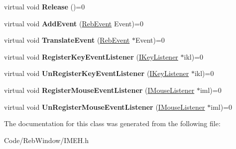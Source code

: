 \begin{DoxyCompactItemize}
\item 
virtual void {\bfseries Release} ()=0\hypertarget{class_i_m_e_h_ac47c3471945c993f1b4dfb35d8dd4a23}{}\label{class_i_m_e_h_ac47c3471945c993f1b4dfb35d8dd4a23}

\item 
virtual void {\bfseries Add\+Event} (\hyperlink{union_reb_event}{Reb\+Event} Event)=0\hypertarget{class_i_m_e_h_aa12fb49a27156061fe02c56b928963e5}{}\label{class_i_m_e_h_aa12fb49a27156061fe02c56b928963e5}

\item 
virtual void {\bfseries Translate\+Event} (\hyperlink{union_reb_event}{Reb\+Event} $\ast$Event)=0\hypertarget{class_i_m_e_h_aeb04da4f2405b896c93d299d0e17aa4c}{}\label{class_i_m_e_h_aeb04da4f2405b896c93d299d0e17aa4c}

\item 
virtual void {\bfseries Register\+Key\+Event\+Listener} (\hyperlink{class_i_key_listener}{I\+Key\+Listener} $\ast$ikl)=0\hypertarget{class_i_m_e_h_ae5c0421dd64b696ef51227254d18efe6}{}\label{class_i_m_e_h_ae5c0421dd64b696ef51227254d18efe6}

\item 
virtual void {\bfseries Un\+Register\+Key\+Event\+Listener} (\hyperlink{class_i_key_listener}{I\+Key\+Listener} $\ast$ikl)=0\hypertarget{class_i_m_e_h_a08078182c8d0b334e941a4314719fa68}{}\label{class_i_m_e_h_a08078182c8d0b334e941a4314719fa68}

\item 
virtual void {\bfseries Register\+Mouse\+Event\+Listener} (\hyperlink{class_i_mouse_listener}{I\+Mouse\+Listener} $\ast$iml)=0\hypertarget{class_i_m_e_h_a06ad1a6f9111d62e428c4047575323b2}{}\label{class_i_m_e_h_a06ad1a6f9111d62e428c4047575323b2}

\item 
virtual void {\bfseries Un\+Register\+Mouse\+Event\+Listener} (\hyperlink{class_i_mouse_listener}{I\+Mouse\+Listener} $\ast$iml)=0\hypertarget{class_i_m_e_h_a5f0ca9fd2c0e154eb7760b64ab2953a7}{}\label{class_i_m_e_h_a5f0ca9fd2c0e154eb7760b64ab2953a7}

\end{DoxyCompactItemize}


The documentation for this class was generated from the following file\+:\begin{DoxyCompactItemize}
\item 
Code/\+Reb\+Window/I\+M\+E\+H.\+h\end{DoxyCompactItemize}
